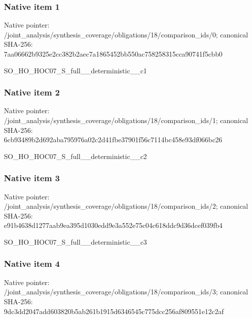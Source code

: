 \documentclass[10pt,a4paper]{article}
\begin{document}
\subsubsection{Native item 1}
Native pointer: /joint\_\allowbreak{}analysis/synthesis\_\allowbreak{}coverage/obligations/18/comparison\_\allowbreak{}ids/0; canonical SHA-256: 7aa06662b9325e2cc382b2aec7a1865452bb550ac758258315cca90741f5cbb0

\begingroup\raggedright\sloppy SO\_\allowbreak{}HO\_\allowbreak{}HOC07\_\allowbreak{}S\_\allowbreak{}full\_\allowbreak{}\_\allowbreak{}deterministic\_\allowbreak{}\_\allowbreak{}c1\par\endgroup

\subsubsection{Native item 2}
Native pointer: /joint\_\allowbreak{}analysis/synthesis\_\allowbreak{}coverage/obligations/18/comparison\_\allowbreak{}ids/1; canonical SHA-256: 6cb93489b2d692aba795976a02c2d41fbe37901f56c7114bc458e93df066bc26

\begingroup\raggedright\sloppy SO\_\allowbreak{}HO\_\allowbreak{}HOC07\_\allowbreak{}S\_\allowbreak{}full\_\allowbreak{}\_\allowbreak{}deterministic\_\allowbreak{}\_\allowbreak{}c2\par\endgroup

\subsubsection{Native item 3}
Native pointer: /joint\_\allowbreak{}analysis/synthesis\_\allowbreak{}coverage/obligations/18/comparison\_\allowbreak{}ids/2; canonical SHA-256: e91b4638d1277aab9ea395d1030edd9e3a552e75c04c618ddc9d36dcef039fb4

\begingroup\raggedright\sloppy SO\_\allowbreak{}HO\_\allowbreak{}HOC07\_\allowbreak{}S\_\allowbreak{}full\_\allowbreak{}\_\allowbreak{}deterministic\_\allowbreak{}\_\allowbreak{}c3\par\endgroup

\subsubsection{Native item 4}
Native pointer: /joint\_\allowbreak{}analysis/synthesis\_\allowbreak{}coverage/obligations/18/comparison\_\allowbreak{}ids/3; canonical SHA-256: 9dc3dd2047add603820b5ab261b1915d6346545c775dcc256af809551e12c2af
\end{document}
